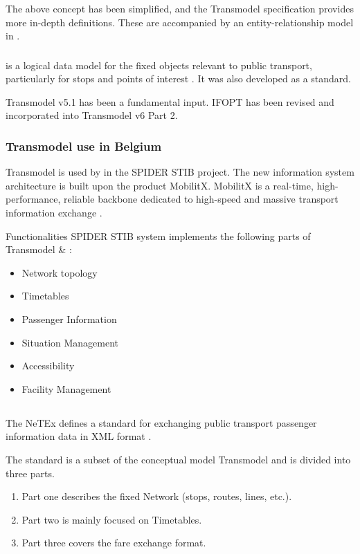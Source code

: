 The above concept has been simplified, and the Transmodel specification provides more in-depth definitions. These are accompanied by an entity-relationship model in .


\subsubsection{}
 is a logical data model for the fixed objects relevant to public transport, particularly for stops and points of interest \cite{noauthor_ifopt_nodate}. It was also developed as a  standard.

Transmodel v5.1 has been a fundamental input. IFOPT has been revised and incorporated into Transmodel v6 Part 2.
\subsubsection{Transmodel use in Belgium}
Transmodel is used by  in the SPIDER STIB project. The new information system architecture is built upon the product MobilitX. MobilitX is a real-time, high-performance, reliable backbone dedicated to high-speed and massive transport information exchange \cite{noauthor_transmodel_nodate}.

Functionalities SPIDER STIB system implements the following parts of Transmodel \& :
\begin{itemize}
    \item Network topology
    \item Timetables
    \item Passenger Information
    \item Situation Management
    \item Accessibility
    \item Facility Management
\end{itemize}

\subsection{}
The NeTEx defines a standard for exchanging public transport passenger information data in XML format \cite{noauthor_downloads_nodate}.  

The standard is a subset of the  conceptual model Transmodel and is divided into three parts. \begin{enumerate}
    \item Part one describes the fixed Network (stops, routes, lines, etc.).
    \item Part two is mainly focused on Timetables.
    \item Part three covers the fare exchange format.
\end{enumerate}

